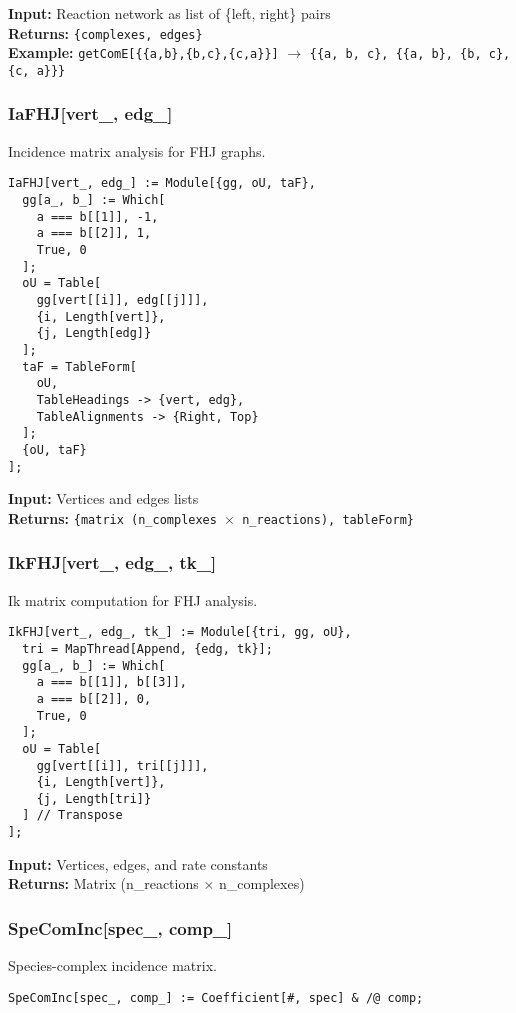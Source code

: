 \documentclass{article}
\begin{document}
\textbf{Input:} Reaction network as list of \{left, right\} pairs\\
\textbf{Returns:} \texttt{\{complexes, edges\}}\\
\textbf{Example:} \texttt{getComE[\{\{a,b\},\{b,c\},\{c,a\}\}]} $\rightarrow$ \texttt{\{\{a, b, c\}, \{\{a, b\}, \{b, c\}, \{c, a\}\}\}}

\subsubsection{IaFHJ[vert\_, edg\_]}
Incidence matrix analysis for FHJ graphs.

\begin{lstlisting}
IaFHJ[vert_, edg_] := Module[{gg, oU, taF},
  gg[a_, b_] := Which[
    a === b[[1]], -1,
    a === b[[2]], 1,
    True, 0
  ];
  oU = Table[
    gg[vert[[i]], edg[[j]]],
    {i, Length[vert]},
    {j, Length[edg]}
  ];
  taF = TableForm[
    oU,
    TableHeadings -> {vert, edg},
    TableAlignments -> {Right, Top}
  ];
  {oU, taF}
];
\end{lstlisting}

\textbf{Input:} Vertices and edges lists\\
\textbf{Returns:} \texttt{\{matrix (n\_complexes $\times$ n\_reactions), tableForm\}}

\subsubsection{IkFHJ[vert\_, edg\_, tk\_]}
Ik matrix computation for FHJ analysis.

\begin{lstlisting}
IkFHJ[vert_, edg_, tk_] := Module[{tri, gg, oU},
  tri = MapThread[Append, {edg, tk}];
  gg[a_, b_] := Which[
    a === b[[1]], b[[3]],
    a === b[[2]], 0,
    True, 0
  ];
  oU = Table[
    gg[vert[[i]], tri[[j]]],
    {i, Length[vert]},
    {j, Length[tri]}
  ] // Transpose
];
\end{lstlisting}

\textbf{Input:} Vertices, edges, and rate constants\\
\textbf{Returns:} Matrix (n\_reactions $\times$ n\_complexes)

\subsubsection{SpeComInc[spec\_, comp\_]}
Species-complex incidence matrix.

\begin{lstlisting}
SpeComInc[spec_, comp_] := Coefficient[#, spec] & /@ comp;
\end{lstlisting}
\end{document}
